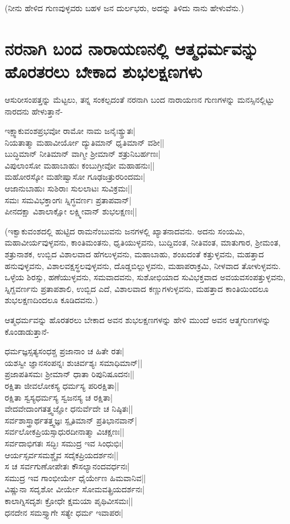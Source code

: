 (ನೀನು ಹೇಳಿದ ಗುಣವುಳ್ಳವರು ಬಹಳ ಜನ ದುರ್ಲಭರು, ಅದನ್ನು ತಿಳಿದು ನಾನು ಹೇಳುವೆನು.) 

\section*{ನರನಾಗಿ ಬಂದ ನಾರಾಯಣನಲ್ಲಿ ಆತ್ಮಧರ್ಮವನ್ನು ಹೊರತರಲು ಬೇಕಾದ ಶುಭಲಕ್ಷಣಗಳು} 

ಆಸುರೀಸಂಪತ್ತನ್ನು ಮೆಟ್ಟಲು, ತನ್ನ ಸಂಕಲ್ಪದಂತೆ ನರನಾಗಿ ಬಂದ ನಾರಾಯಣನ ಗುಣಗಳನ್ನು ಮನಸ್ಸಿನಲ್ಲಿಟ್ಟು ನಾರದನು ಹೇಳುತ್ತಾನೆ- 

\begin{shloka} 
ಇಕ್ಷ್ವಾಕುವಂಶಪ್ರಭವೋ ರಾಮೋ ನಾಮ ಜನೈಃಶ್ಯ್ರುತಃ|\\ 
ನಿಯತಾತ್ಮಾ ಮಹಾವೀರ್ಯೋ ದ್ಯುತಿಮಾನ್ ಧೃತಿಮಾನ್ ವಶೀ||\\ 
ಬುದ್ಧಿಮಾನ್ ನೀತಿಮಾನ್ ವಾಗ್ಮೀ ಶ್ರೀಮಾನ್ ಶತ್ರುನಿಬರ್ಹಣಃ|\\ 
ವಿಪುಲಾಂಸೋ ಮಹಾಬಾಹುಃ ಕಂಬುಗ್ರೀವೋ ಮಹಾಹನುಃ||\\ 
ಮಹೋರಸ್ಕೋ ಮಹೇಷ್ವಾಸೋ ಗೂಢಜತ್ರುರರಿಂದಮಃ|\\ 
ಆಜಾನುಬಾಹುಃ ಸುಶಿರಾಃ ಸುಲಲಾಟಃ ಸುವಿಕ್ರಮಃ||\\ 
ಸಮಃ ಸಮವಿಭಕ್ತಾಂಗಃ ಸ್ನಿಗ್ಧವರ್ಣಃ ಪ್ರತಾಪವಾನ್|\\ 
ಪೀನದಕ್ಷಾ ವಿಶಾಲಾಕ್ಷೋ ಲಕ್ಷ್ಮೀವಾನ್ ಶುಭಲಕ್ಷಣಃ||
\end{shloka} 

(ಇಕ್ವಾಕುವಂಶದಲ್ಲಿ ಹುಟ್ಟಿದ ರಾಮನೆಂಬುವನು ಜನಗಳಲ್ಲಿ ಖ್ಯಾತನಾದವನು. ಅದನು ಸಂಯಮಿ, ಮಹಾವೀರ್ಯವುಳ್ಳವನು, ಕಾಂತಿಮಂತನು, ಧೃತಿಯುಳ್ಳವನು, ಬುದ್ದಿವಂತ, ನೀತಿವಂತ, ಮಾತುಗಾರ, ಶ್ರೀಮಂತ, ಶತ್ರುನಾಶಕ, ಉಬ್ಬಿದ ವಿಶಾಲವಾದ ಹೆಗಲುಳ್ಳವನು, ಮಹಾಬಾಹು, ಶಂಖದಂತೆ ಕತ್ತುಳ್ಳವನು, ಮಹತ್ತಾದ ಹನುವುಳ್ಳವನು, ವಿಶಾಲವಕ್ಷಸ್ಥಲವುಳ್ಳವನು, ದೊಡ್ಡಬಿಲ್ಲುಳ್ಳವನು, ಮಹಾಪರಾಕ್ರಮಿ, ನೀಳವಾದ ತೋಳುಳ್ಳವನು. ಒಳ್ಳೆಯ ಶಿರಸ್ಸು, ಹಣೆಯುಳ್ಳವನು, ಸಮವಾದವನು, ಸುಶೋಭಿಯಾದ ಸುವಿಭಕ್ತವಾದ ಅವಯವಸಂಪತ್ತುಳ್ಳವನು, ಸ್ನಿಗ್ದವರ್ಣನು ಪ್ರತಾಪಶಾಲಿ, ಉಬ್ಬಿದ ಎದೆ, ವಿಶಾಲವಾದ ಕಣ್ಣುಗಳುಳ್ಳವನು, ಮಹತ್ತಾದ ಕಾಂತಿಯಿಂದಲೂ ಶುಭಲಕ್ಷಣದಿಂದಲೂ ಕೂಡಿದವನು.) 

ಆತ್ಮಧರ್ಮವನ್ನು ಹೊರತರಲು ಬೇಕಾದ ಅವನ ಶುಭಲಕ್ಷಣಗಳನ್ನು ಹೇಳಿ ಮುಂದೆ ಅವನ ಆತ್ಮಗುಣಗಳನ್ನು ಕೊಂಡಾಡುತ್ತಾನೆ- 

\begin{shloka} 
ಧರ್ಮಜ್ಞಸ್ಸತ್ಯಸಂಧಶ್ಚ ಪ್ರಜಾನಾಂ ಚ ಹಿತೇ ರತಃ|\\ 
ಯಶಸ್ವೀ ಜ್ಞಾನಸಂಪನ್ನಃ ಶುಚಿರ್ವಶ್ಯಃ ಸಮಾಧಿಮಾನ್||\\ 
ಪ್ರಜಾಪತಿಸಮಃ ಶ್ರೀಮಾನ್ ಧಾತಾ ರಿಪುನಿಷೂದನಃ||\\ 
ರಕ್ಷಿತಾ ಜೀವಲೋಕಸ್ಯ ಧರ್ಮಸ್ಯ ಪರಿರಕ್ಷಿತಾ||\\ 
ರಕ್ಷಿತಾ ಸ್ವಸ್ಯಧರ್ಮಸ್ಯ ಸ್ವಜನಸ್ಯ ಚ ರಕ್ಷಿತಾ|\\ 
ವೇದವೇದಾಂಗತತ್ತ್ವಜ್ಞೋ ಧನುರ್ವೆದೇ ಚ ನಿಷ್ಠಿತಃ||\\ 
ಸರ್ವಶಾಸ್ತ್ರಾರ್ಥತತ್ತ್ವಜ್ಞಃ ಸ್ಪೃತಿಮಾನ್ ಪ್ರತಿಭಾನವಾನ್|\\ 
ಸರ್ವಲೋಕಪ್ರಿಯಸ್ಸಾಧುರದೀನಾತ್ಮಾ ವಿಚಕ್ಷಣಃ||\\ 
ಸರ್ವದಾಭಿಗತಃ ಸದ್ಭಿಃ ಸಮುದ್ರ ಇವ ಸಿಂಧುಭಿಃ|\\ 
ಆರ್ಯಸ್ಸರ್ವಸಮಶ್ಚೈವ ಸದೈಕಪ್ರಿಯದರ್ಶನಃ||\\ 
ಸ ಚ ಸರ್ವಗುಣೋಪೇತಃ ಕೌಸಲ್ಯಾನಂದವರ್ಧನಃ|\\ 
ಸಮುದ್ರ ಇವ ಗಾಂಭೀರ್ಯೇ ಧೈರ್ಯೇಣ ಹಿಮವಾನಿವ||\\ 
ವಿಷ್ಣುನಾ ಸದೃಶೋ ವೀರ್ಯೇ ಸೋಮವತ್ಪ್ರಿಯದರ್ಶನಃ|\\ 
ಕಾಲಾಗ್ನಿಸದೃಶಃ ಕ್ರೋಧೇ ಕ್ಷಮಯಾ ಪೃಥಿವೀಸಮಃ||\\ 
ಧನದೇನ ಸಮಸ್ತ್ಯಾಗೇ ಸತ್ಯೇ ಧರ್ಮ ಇವಾಪರಃ|
\end{shloka} 

